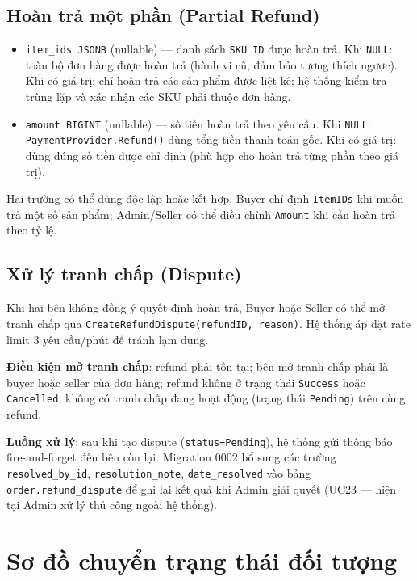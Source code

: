 \subsection*{Hoàn trả một phần (Partial Refund)}


\begin{itemize}
  \item \texttt{item\_ids JSONB} (nullable) — danh sách \texttt{SKU ID} được hoàn trả. Khi \texttt{NULL}: toàn bộ đơn hàng được hoàn trả (hành vi cũ, đảm bảo tương thích ngược). Khi có giá trị: chỉ hoàn trả các sản phẩm được liệt kê; hệ thống kiểm tra trùng lặp và xác nhận các SKU phải thuộc đơn hàng.
  \item \texttt{amount BIGINT} (nullable) — số tiền hoàn trả theo yêu cầu. Khi \texttt{NULL}: \texttt{PaymentProvider.Refund()} dùng tổng tiền thanh toán gốc. Khi có giá trị: dùng đúng số tiền được chỉ định (phù hợp cho hoàn trả từng phần theo giá trị).
\end{itemize}

Hai trường có thể dùng độc lập hoặc kết hợp. Buyer chỉ định \texttt{ItemIDs} khi muốn trả một số sản phẩm; Admin/Seller có thể điều chỉnh \texttt{Amount} khi cần hoàn trả theo tỷ lệ.

\subsection*{Xử lý tranh chấp (Dispute)}

Khi hai bên không đồng ý quyết định hoàn trả, Buyer hoặc Seller có thể mở tranh chấp qua \texttt{CreateRefundDispute(refundID, reason)}. Hệ thống áp đặt rate limit 3 yêu cầu/phút để tránh lạm dụng.

\textbf{Điều kiện mở tranh chấp}: refund phải tồn tại; bên mở tranh chấp phải là buyer hoặc seller của đơn hàng; refund không ở trạng thái \texttt{Success} hoặc \texttt{Cancelled}; không có tranh chấp đang hoạt động (trạng thái \texttt{Pending}) trên cùng refund.

\textbf{Luồng xử lý}: sau khi tạo dispute (\texttt{status=Pending}), hệ thống gửi thông báo fire-and-forget đến bên còn lại. Migration 0002 bổ sung các trường \texttt{resolved\_by\_id}, \texttt{resolution\_note}, \texttt{date\_resolved} vào bảng \texttt{order.refund\_dispute} để ghi lại kết quả khi Admin giải quyết (UC23 --- hiện tại Admin xử lý thủ công ngoài hệ thống).

\section{Sơ đồ chuyển trạng thái đối tượng}

